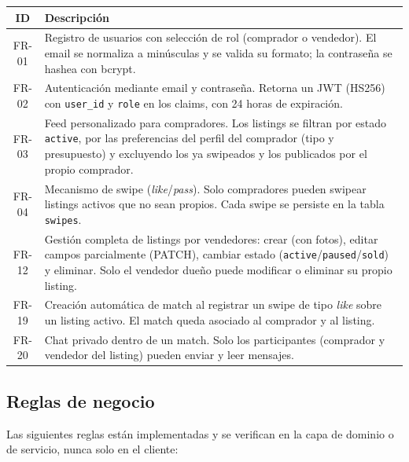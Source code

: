 \documentclass[12pt,a4paper]{article}
\begin{document}
\begin{center}
\begin{tabular}{cp{10.5cm}}
  \toprule
  \textbf{ID} & \textbf{Descripción} \\
  \midrule
  FR-01 & Registro de usuarios con selección de rol (comprador o vendedor). El email se
          normaliza a minúsculas y se valida su formato; la contraseña se hashea con bcrypt. \\[3pt]
  FR-02 & Autenticación mediante email y contraseña. Retorna un JWT (HS256) con \texttt{user\_id}
          y \texttt{role} en los claims, con 24 horas de expiración. \\[3pt]
  FR-03 & Feed personalizado para compradores. Los listings se filtran por estado
          \texttt{active}, por las preferencias del perfil del comprador (tipo y presupuesto) y
          excluyendo los ya swipeados y los publicados por el propio comprador. \\[3pt]
  FR-04 & Mecanismo de swipe (\emph{like}/\emph{pass}). Solo compradores pueden swipear listings
          activos que no sean propios. Cada swipe se persiste en la tabla
          \texttt{swipes}. \\[3pt]
  FR-12 & Gestión completa de listings por vendedores: crear (con fotos), editar campos
          parcialmente (PATCH), cambiar estado (\texttt{active}/\texttt{paused}/\texttt{sold})
          y eliminar. Solo el vendedor dueño puede modificar o eliminar su propio listing. \\[3pt]
  FR-19 & Creación automática de match al registrar un swipe de tipo \emph{like} sobre un
          listing activo. El match queda asociado al comprador y al listing. \\[3pt]
  FR-20 & Chat privado dentro de un match. Solo los participantes (comprador y vendedor del
          listing) pueden enviar y leer mensajes. \\
  \bottomrule
\end{tabular}
\end{center}

\subsection{Reglas de negocio}

Las siguientes reglas están implementadas y se verifican en la capa de dominio o de servicio,
nunca solo en el cliente:
\end{document}
